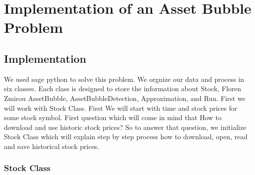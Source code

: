 
\chapter{Implementation of an Asset Bubble Problem}
\section{Implementation}
We used sage python to solve this problem. We orgnize our data and process in six classes. Each class is designed to store the information about Stock, Floren Zmirou
AssetBubble, AssetBubbleDetection, Approximation, and Run. First we will work with Stock Class.
First We will start with time and stock prices for some stock symbol. First question which will come in mind that How to download and use historic stock prices?
So to answer that question, we initialize Stock Class which will explain step by step process how to download, open, read and save historical stock prices.

\subsection{Stock Class}
